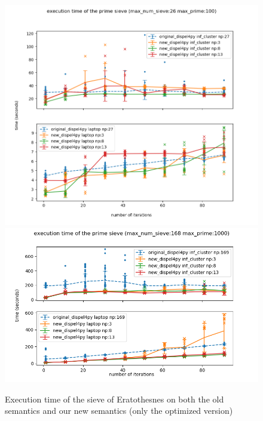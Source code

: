 \begin{figure}[h]
\centering
    \includegraphics[width=1\textwidth]{figures/sieve_opt1_100}
    \includegraphics[width=1\textwidth]{figures/sieve_opt1_1000}
\caption{Execution time of the sieve of Eratothesnes on both the old semantics and our new semantics (only the optimized version)}
\label{fig:sieve_opt1}
\end{figure}
